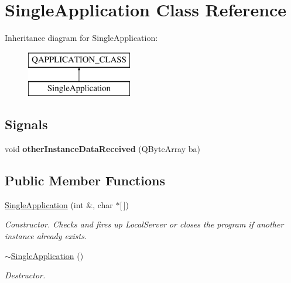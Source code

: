 \hypertarget{class_single_application}{}\section{Single\+Application Class Reference}
\label{class_single_application}
Inheritance diagram for Single\+Application\+:\begin{figure}[H]
\begin{center}
\leavevmode
\includegraphics[height=2.000000cm]{class_single_application}
\end{center}
\end{figure}
\subsection*{Signals}
\begin{DoxyCompactItemize}
\item 
\hypertarget{class_single_application_afc6621000a339c859a5f188946505af8}{}void {\bfseries other\+Instance\+Data\+Received} (Q\+Byte\+Array ba)\label{class_single_application_afc6621000a339c859a5f188946505af8}

\end{DoxyCompactItemize}
\subsection*{Public Member Functions}
\begin{DoxyCompactItemize}
\item 
\hyperlink{class_single_application_aa2de0d9769181e267d261f08e3ddc5d9}{Single\+Application} (int \&, char $\ast$\mbox{[}$\,$\mbox{]})
\begin{DoxyCompactList}\small\item\em Constructor. Checks and fires up Local\+Server or closes the program if another instance already exists. \end{DoxyCompactList}\item 
\hypertarget{class_single_application_aa845dd6c6f0b01d8959f4056ded1295b}{}\hyperlink{class_single_application_aa845dd6c6f0b01d8959f4056ded1295b}{$\sim$\+Single\+Application} ()\label{class_single_application_aa845dd6c6f0b01d8959f4056ded1295b}

\begin{DoxyCompactList}\small\item\em Destructor. \end{DoxyCompactList}\end{DoxyCompactItemize}
